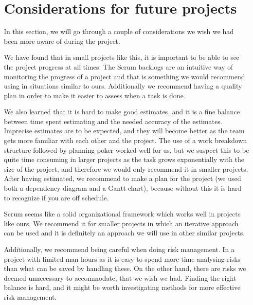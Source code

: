 \section{Considerations for future projects}
In this section, we will go through a couple of considerations we wish we had
been more aware of during the project.

We have found that in small projects like this, it is important to be able to
see the project progress at all times. The Scrum backlogs are an intuitive way
of monitoring the progress of a project and that is something we would
recommend using in situations similar to ours. Additionally we recommend having
a quality plan in order to make it easier to assess when a task is done.

We also learned that it is hard to make good estimates, and it is a fine balance
between time spent estimating and the needed accuracy of the estimates. 
Imprecise estimates are to be expected, and they will become better as the team
gets more familiar with each other and the project. The use of a work breakdown
structure followed by planning poker worked well for us, but we suspect this to
be quite time consuming in larger projects as the task grows exponentially with
the size of the project, and therefore we would only recommend it in smaller
projects. After having estimated, we recommend to make a plan for the project
(we used both a dependency diagram and a Gantt chart), because without this it is hard to recognize if you are off schedule.

Scrum seems like a solid organizational framework which works well in projects
like ours. We recommend it for smaller projects in which an iterative approach
can be used and it is definitely an approach we will use in other similar
projects.

Additionally, we recommend being careful when doing risk management. In a
project with limited man hours as it is easy to spend more time analysing risks
than what can be saved by handling these. On the other hand, there are risks we
deemed unnecessary to accommodate, that we wish we had. Finding the right
balance is hard, and it might be worth investigating methods for more effective risk
management.
